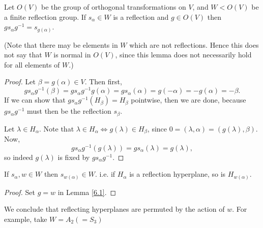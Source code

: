 \begin{lemma} \label{6.1}
Let $O(V)$ be the group of orthogonal transformations on $V$, and
$W < O(V)$ be a finite reflection group. If $s_\alpha \in W$ is a reflection
and $g \in O(V)$ then $g s_\alpha g^{-1} = s_{g(\alpha)}$.
\end{lemma}

(Note that there may be elements in $W$ which are not reflections. Hence this
does not say that $W$ is normal in $O(V)$, since this lemma does not necessarily
hold for all elements of $W$.)

\begin{proof}
Let $\beta = g(\alpha) \in V$. Then first,
\[
g s_\alpha g^{-1}(\beta) = g s_\alpha g^{-1} g(\alpha)
= g s_\alpha(\alpha) = g(-\alpha) = -g(\alpha) = -\beta.
\]
If we can show that $g s_\alpha g^{-1} (H_\beta) = H_\beta$ pointwise, then we
are done, because $g s_\alpha g^{-1}$ must then be the reflection $s_\beta$.

Let $\lambda \in H_\alpha$. Note that $\lambda \in H_\alpha \iff
g(\lambda) \in H_\beta$, since $0 = (\lambda, \alpha) = (g(\lambda), \beta)$.
Now,
\[
    g s_\alpha g^{-1} (g(\lambda)) = g s_\alpha(\lambda) = g(\lambda),
\]
so indeed $g(\lambda)$ is fixed by $g s_\alpha g^{-1}$.
\end{proof}


\begin{corollary} \label{6.2}
If $s_\alpha, w \in W$ then $s_{w(\alpha)} \in W$.
i.e. if $H_\alpha$ is a reflection hyperplane, so is $H_{w(\alpha)}$.
\end{corollary}
\begin{proof}
Set $g = w$ in Lemma \ref{6.1}.
\end{proof}

We conclude that reflecting hyperplanes are permuted by the action of $w$. For
example, take $W = A_2 (= S_3)$

%
%

